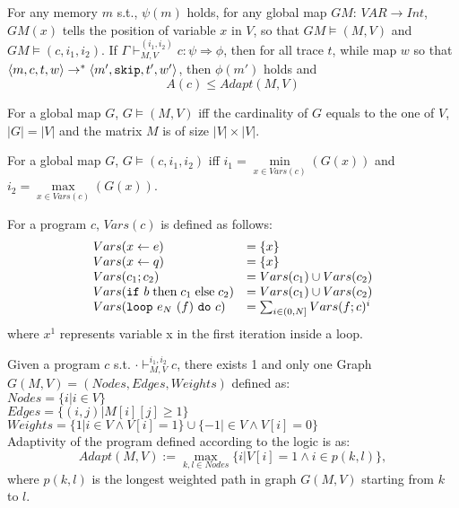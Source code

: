 \documentclass[a4paper,11pt]{article}
\begin{document}
\begin{defn}
For any memory $m$ s.t., $\psi(m)$ holds, for any global map $GM$: $VAR \to Int$, $GM(x)$ tells the position of variable $x$ in $V$, so that $GM \vDash (M,V)$ and $GM \vDash (c, i_1, i_2)$. If $ \Gamma \vdash_{M,V}^{(i_1,i_2)} c : \psi \Rightarrow \phi$,  then for all trace $t$, while map $w$ so that $ \langle m, c, t,w \rangle \rightarrow^{*} \langle m', \mathtt{skip}, t', w' \rangle$, then $\phi(m')$ holds and 
\[
A(c) \leq Adapt(M, V)
\]      
\end{defn}

\begin{defn}
For a global map $G$, $G \vDash (M,V)$ iff the cardinality of $G$ equals to the one of $V$, $|G| = |V|$ and the matrix $M$ is of size $|V| \times |V|$.
\end{defn}

\begin{defn}
For a global map $G$, $G \vDash (c,i_1,i_2)$ iff $i_1= \underset{x \in Vars(c)}{\min}(G(x))$ and $i_2= \underset{x \in Vars(c)}{\max}(G(x))$.
\end{defn}

\begin{defn}[Vars]
For a program $c$, $Vars(c)$ is defined as follows:
\[
\begin{array}{ll}
 Vars( \mathrel{ x \leftarrow e })     & = \{ x \}  \\
 Vars( \mathrel{ x \leftarrow q })     & = \{ x \} \\
 Vars( c_1; c_2)     & =  Vars( c_1) \cup Vars(c_2) \\
  Vars( \mathtt{if} ~ b \mbox{\;then\;} c_1 \mbox{\;else\;} c_2)     & =  Vars( c_1) \cup Vars(c_2) \\
  Vars( \mathtt{loop} ~ e_N ~ (f) ~ \mathtt{do} ~ c )     & =  \sum_{i \in (0, N] } Vars(f;c)^{i} \\
\end{array}
\]
where $x^{1}$ represents variable x in the first iteration inside a loop. 
\end{defn}

\begin{defn}
[Adapt]
Given a program $c$ s.t. $\cdot \vdash_{M,V}^{i_1, i_2} c$, there exists 1 and only one Graph $G(M, V) = (Nodes, Edges, Weights)$ defined as:
\\
$Nodes = \{i | i \in V\}$
\\
$Edges = \{ (i, j) | M[i][j] \geq 1 \}$
\\
$ Weights = \{ 1 | i \in V \land V[i] = 1\}
        \cup \{ -1 | \in V \land V[i] = 0\}$
\\
Adaptivity of the program defined according to the logic is as:
\[
Adapt(M, V) := \max_{k, l \in Nodes}\{i | V[i] = 1 \land i \in p(k, l) \},
\]
where $p(k, l)$ is the longest weighted path in graph $G(M, V)$ starting from $k$ to $l$.
\end{defn}
%
%
\end{document}
